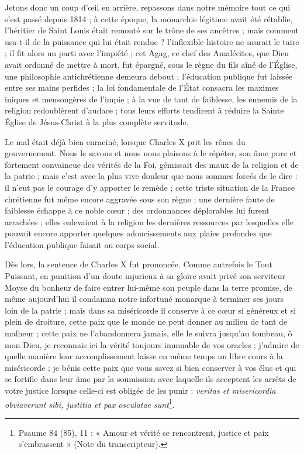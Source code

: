\documentclass[11pt,a4paper]{report}
\begin{document}
Jetons donc un coup d'œil en arrière, repassons dans notre mémoire tout ce qui s'est passé depuis 1814 ; à cette époque, la monarchie légitime avait été rétablie, l'héritier de Saint Louis était remonté sur le trône de ses ancêtres ; mais comment usa-t-il de la puissance qui lui était rendue ? l'inflexible histoire ne saurait le taire ; il fit alors un parti avec l'impiété ; cet Agag, ce chef des Amalécites, que Dieu avait ordonné de mettre à mort, fut épargné, sous le règne du fils aîné de l'Église, une philosophie antichrétienne demeura debout ; l'éducation publique fut laissée entre ses mains perfides ; la loi fondamentale de l'État consacra les maximes iniques et mensongères de l'impie ; à la vue de tant de faiblesse, les ennemis de la religion redoublèrent d'audace ; tous leurs efforts tendirent à réduire la Sainte Église de Jésus-Christ à la plus complète servitude.

Le mal était déjà bien enraciné, lorsque Charles X prit les rênes du gouvernement. Nous le savons et nous nous plaisons à le répéter, son âme pure et fortement convaincue des vérités de la Foi, gémissait des maux de la religion et de la patrie ; mais c'est avec la plus vive douleur que nous sommes forcés de le dire : il n'eut pas le courage d'y apporter le remède ; cette triste situation de la France chrétienne fut même encore aggravée sous son règne ; une dernière faute de faiblesse échappe à ce noble cœur ; des ordonnances déplorables lui furent arrachées ; elles enlevaient à la religion les dernières ressources par lesquelles elle pouvait encore apporter quelques adoucissements aux plaies profondes que l'éducation publique faisait au corps social.

Dès lors, la sentence de Charles X fut prononcée. Comme autrefois le Tout Puissant, en punition d'un doute injurieux à sa gloire avait privé son serviteur Moyse du bonheur de faire entrer lui-même son peuple dans la terre promise, de même aujourd'hui il condamna notre infortuné monarque à terminer ses jours loin de la patrie ; mais dans sa miséricorde il conserve à ce cœur si généreux et si plein de droiture, cette paix que le monde ne peut donner au milieu de tant de malheur ; cette paix ne l'abandonnera jamais, elle le suivra jusqu'au tombeau, ô mon Dieu, je reconnais ici la vérité toujours immuable de vos oracles ; j'admire de quelle manière leur accomplissement laisse en même temps un libre cours à la miséricorde ; je bénis cette paix que vous savez si bien conserver à vos élus et qui se fortifie dans leur âme par la soumission avec laquelle ils acceptent les arrêts de votre justice lorsque celle-ci est obligée de les punir : \textit{veritas et misericordia obviaverunt sibi, justitia et pax osculatae sunt}\footnote{Psaume 84 (85), 11 : « Amour et vérité se rencontrent, justice et paix s'embrassent » (Note du transcripteur).}.
\end{document}
